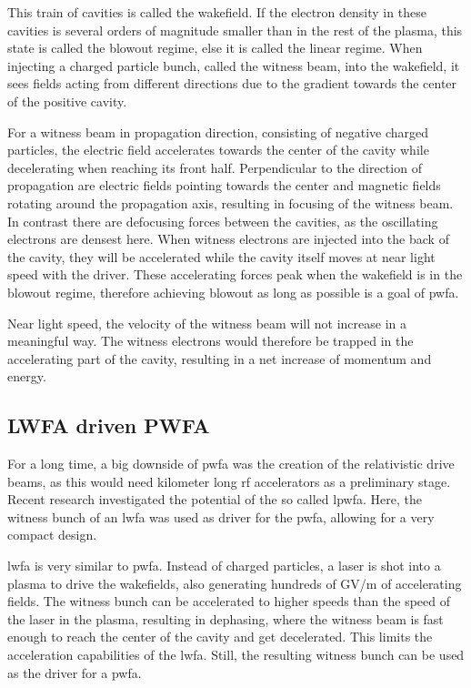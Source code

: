 \documentclass[bachelor_thesis]{subfiles}
\begin{document}
This train of cavities is called the wakefield. If the electron density in these cavities is several orders of magnitude smaller than in the rest of the plasma, this state is called the blowout regime, else it is called the linear regime.
When injecting a charged particle bunch, called the witness beam, into the wakefield, it sees fields acting from different directions due to the gradient towards the center of the positive cavity. 

For a witness beam in propagation direction, consisting of negative charged particles, the electric field accelerates towards the center of the cavity while decelerating when reaching its front half. 
Perpendicular to the direction of propagation are electric fields pointing towards the center and magnetic fields rotating around the propagation axis, resulting in focusing of the witness beam. In contrast there are defocusing forces between the cavities, as the oscillating electrons are densest here.
When witness electrons are injected into the back of the cavity, they will be accelerated while the cavity itself moves at near light speed with the driver.
These accelerating forces peak when the wakefield is in the blowout regime, therefore achieving blowout as long as possible is a goal of \gls{pwfa}.

Near light speed, the velocity of the witness beam will not increase in a meaningful way. The witness electrons would therefore be trapped in the accelerating part of the cavity, resulting in a net increase of momentum and energy.

\subsection{LWFA driven PWFA} \label{chap:lpfwa}
For a long time, a big downside of \gls{pwfa} was the creation of the relativistic drive beams, as this would need kilometer long \gls{rf} accelerators as a preliminary stage. Recent research \cite{Kurz2021} investigated the potential of the so called \gls{lpwfa}.
Here, the witness bunch of an \gls{lwfa} was used as driver for the \gls{pwfa}, allowing for a very compact design.

\Gls{lwfa} is very similar to \gls{pwfa}. Instead of charged particles, a laser is shot into a plasma to drive the wakefields, also generating hundreds of \unit{\giga\volt/\m} of accelerating fields.
The witness bunch can be accelerated to higher speeds than the speed of the laser in the plasma, resulting in dephasing, where the witness beam is fast enough to reach the center of the cavity and get decelerated. 
This limits the acceleration capabilities of the \gls{lwfa}. Still, the resulting witness bunch can be used as the driver for a \gls{pwfa}.
\end{document}
